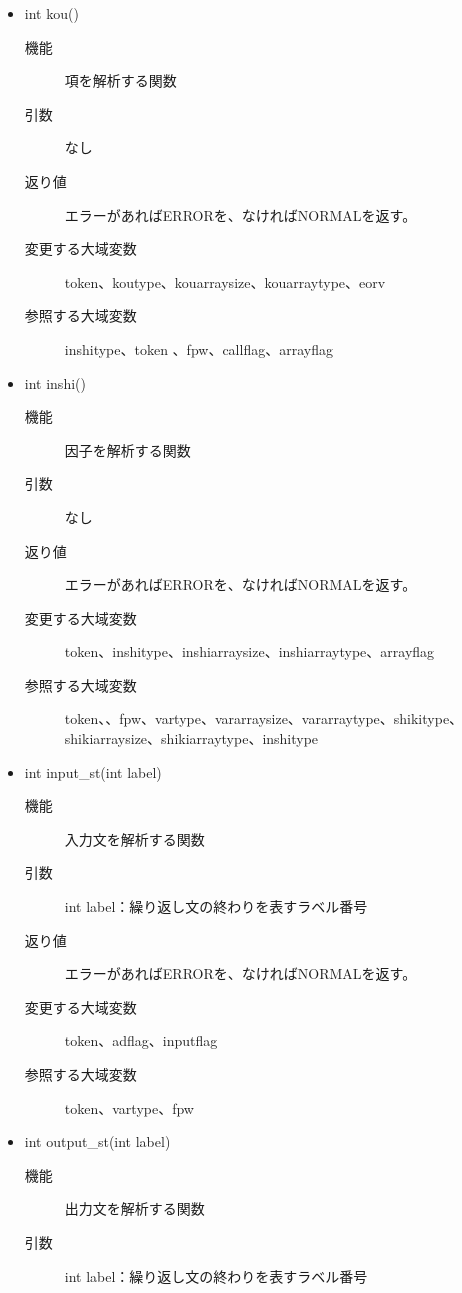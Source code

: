 \documentclass{jarticle}
\begin{document}
\begin{itemize}
\begin{description}
\item[引数]なし
\item[返り値]エラーがあればERRORを、なければNORMALを返す。
\item[変更する大域変数]token、simpletype、simplearraytype、simplearraysize、eorv
\item[参照する大域変数]token、koutype、kouarraytype、kouarraysize、fpw、arrayflag
\end{description}
\item int kou()
\begin{description}
\item[機能]項を解析する関数
\item[引数]なし
\item[返り値]エラーがあればERRORを、なければNORMALを返す。
\item[変更する大域変数]token、koutype、kouarraysize、kouarraytype、eorv
\item[参照する大域変数]inshitype、token	、fpw、callflag、arrayflag
\end{description}
\item int inshi()
\begin{description}
\item[機能]因子を解析する関数
\item[引数]なし
\item[返り値]エラーがあればERRORを、なければNORMALを返す。
\item[変更する大域変数]token、inshitype、inshiarraysize、inshiarraytype、arrayflag
\item[参照する大域変数]token、、fpw、vartype、vararraysize、vararraytype、shikitype、shikiarraysize、shikiarraytype、inshitype
\end{description}
\item int input\_st(int label)
\begin{description}
\item[機能]入力文を解析する関数
\item[引数]int label：繰り返し文の終わりを表すラベル番号
\item[返り値]エラーがあればERRORを、なければNORMALを返す。
\item[変更する大域変数]token、adflag、inputflag
\item[参照する大域変数]token、vartype、fpw
\end{description}
\item int output\_st(int label)
\begin{description}
\item[機能]出力文を解析する関数
\item[引数]int label：繰り返し文の終わりを表すラベル番号

\end{description}
\end{itemize}
\end{document}
